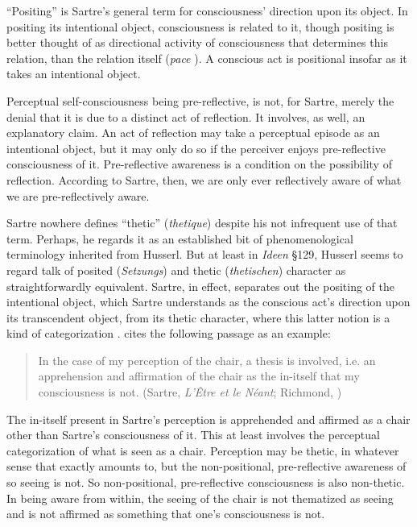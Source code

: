 ``Positing'' is Sartre's general term for consciousness' direction upon its object. In positing its intentional object, consciousness is related to it, though positing is better thought of as directional activity of consciousness that determines this relation, than the relation itself (\emph{pace} \citealt[66]{Boyle:2024if}). A conscious act is positional insofar as it takes an intentional object.

Perceptual self-consciousness being pre-reflective, is not, for Sartre, merely the denial that it is due to a distinct act of reflection. It involves, as well, an explanatory claim. An act of reflection may take a perceptual episode as an intentional object, but it may only do so if the perceiver enjoys pre-reflective consciousness of it. Pre-reflective awareness is a condition on the possibility of reflection. According to Sartre, then, we are only ever reflectively aware of what we are pre-reflectively aware.

Sartre nowhere defines ``thetic'' (\emph{thetique}) despite his not infrequent use of that term. Perhaps, he regards it as an established bit of phenomenological terminology inherited from Husserl. But at least in \emph{Ideen} §129, Husserl seems to regard talk of posited (\emph{Setzungs}) and thetic (\emph{thetischen}) character as straightforwardly equivalent. Sartre, in effect, separates out the positing of the intentional object, which Sartre understands as the conscious act's direction upon its transcendent object, from its thetic character, where this latter notion is a kind of categorization \citep{Webber:2002aa}. \citet{Webber:2002aa} cites the following passage as an example:
\begin{quote}
	In the case of my perception of the chair, a thesis is involved, i.e. an apprehension and affirmation of the chair as the in-itself that my consciousness is not. (Sartre, \emph{L'Être et le Néant}; Richmond, \citeyear[205]{Sartre:2018aa})
\end{quote}
The in-itself present in Sartre's perception is apprehended and affirmed as a chair other than Sartre's consciousness of it. This at least involves the perceptual categorization of what is seen as a chair. Perception may be thetic, in whatever sense  that exactly amounts to, but the non-positional, pre-reflective awareness of so seeing is not. So non-positional, pre-reflective consciousness is also non-thetic. In being aware from within, the seeing of the chair is not thematized as seeing and is not affirmed as something that one's consciousness is not.

